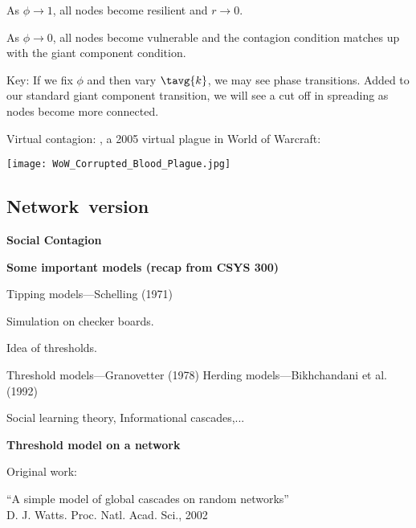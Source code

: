     As \alert{$\phi \rightarrow 1$}, all nodes become resilient and $r \rightarrow 0$.
   
    As \alert{$\phi \rightarrow 0$}, all nodes become vulnerable and the contagion
    condition matches up with the giant component condition.
  
    \alert{Key}: If we fix $\phi$ and then vary $\tavg{k}$, we
    may see  phase transitions.
   Added to our standard giant component transition,
    we will see a cut off in spreading as nodes become more connected.
  


  Virtual contagion:
  ,
  a 2005 virtual plague in World of Warcraft:
  
  \begin{center}
    \texttt{[image: WoW\_Corrupted\_Blood\_Plague.jpg]}
  \end{center}


\subsection{Network\ version}

  \textbf{Social Contagion}

  \textbf{Some important models (recap from CSYS 300)}
    
     Tipping models---Schelling (1971)\cite{schelling1971a,schelling1973a,schelling1978a}
      
      
        Simulation on checker boards.
      
        Idea of thresholds.
      
     Threshold models---Granovetter (1978)\cite{granovetter1978a}
     Herding models---Bikhchandani et al. (1992)\cite{bikhchandani1992a,bikhchandani1998a}
      
      
        Social learning theory, Informational cascades,...
      
    
  


  \textbf{Threshold model on a network}

  Original work:

  \bigskip

  \alert{``A simple model of global cascades on random networks''}\\
  D. J. Watts.  Proc. Natl. Acad. Sci., 2002\cite{watts2002a}

  \bigskip

